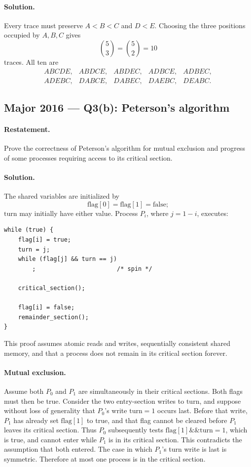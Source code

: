 \documentclass[11pt,a4paper]{article}
\begin{document}
\paragraph{Solution.}
Every trace must preserve \(A<B<C\) and \(D<E\).  Choosing the three
positions occupied by \(A,B,C\) gives
\[
\binom{5}{3}=\binom{5}{2}=10
\]
traces.  All ten are
\[
\begin{array}{lllll}
ABCDE, & ABDCE, & ABDEC, & ADBCE, & ADBEC,\\
ADEBC, & DABCE, & DABEC, & DAEBC, & DEABC.
\end{array}
\]

\subsection*{Major 2016 --- Q3(b): Peterson's algorithm}

\paragraph{Restatement.}
Prove the correctness of Peterson's algorithm for mutual exclusion and
progress of some processes requiring access to its critical section.

\paragraph{Solution.}
The shared variables are initialized by
\[
\mathrm{flag}[0]=\mathrm{flag}[1]=\mathrm{false};
\]
\(\mathrm{turn}\) may initially have either value.  Process \(P_i\),
where \(j=1-i\), executes:

\begin{verbatim}
while (true) {
    flag[i] = true;
    turn = j;
    while (flag[j] && turn == j)
        ;                       /* spin */

    critical_section();

    flag[i] = false;
    remainder_section();
}
\end{verbatim}

This proof assumes atomic reads and writes, sequentially consistent
shared memory, and that a process does not remain in its critical
section forever.

\paragraph{Mutual exclusion.}
Assume both \(P_0\) and \(P_1\) are simultaneously in their critical
sections.  Both flags must then be true.  Consider the two entry-section
writes to \(\mathrm{turn}\), and suppose without loss of generality that
\(P_0\)'s write \(\mathrm{turn}=1\) occurs last.  Before that write,
\(P_1\) has already set \(\mathrm{flag}[1]\) to true, and that flag
cannot be cleared before \(P_1\) leaves its critical section.  Thus
\(P_0\) subsequently tests
\(\mathrm{flag}[1]\mathbin{\&\&}\mathrm{turn}=1\), which is true, and
cannot enter while \(P_1\) is in its critical section.  This
contradicts the assumption that both entered.  The case in which
\(P_1\)'s turn write is last is symmetric.  Therefore at most one
process is in the critical section.
\end{document}
